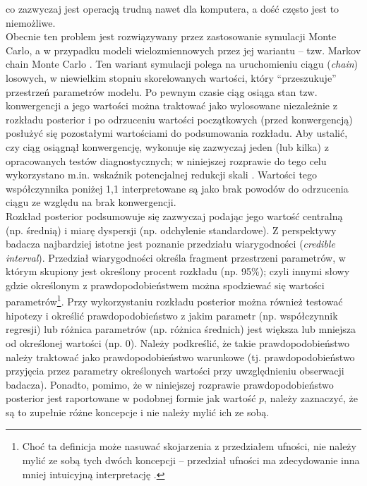 \documentclass[man]{apa6}
\begin{document}
co zazwyczaj jest operacją trudną nawet dla komputera, a dość często jest to niemożliwe. \\
Obecnie ten problem jest rozwiązywany przez zastosowanie symulacji Monte Carlo, a w przypadku modeli wielozmiennowych przez jej wariantu -- tzw. Markov chain Monte Carlo \parencite[MCMC,][]{hastings1970monte}. Ten wariant symulacji polega na uruchomieniu ciągu (\emph{chain}) losowych, w niewielkim stopniu skorelowanych wartości, który ``przeszukuje'' przestrzeń parametrów modelu. Po pewnym czasie ciąg osiąga stan tzw. konwergencji a jego wartości można traktować jako wylosowane niezależnie z rozkładu posterior i po odrzuceniu wartości początkowych (przed konwergencją) posłużyć się pozostałymi wartościami do podsumowania rozkładu. Aby ustalić, czy ciąg osiągnął konwergencję, wykonuje się zazwyczaj jeden (lub kilka) z opracowanych testów diagnostycznych; w niniejszej rozprawie do tego celu wykorzystano m.in. wskaźnik potencjalnej redukcji skali \parencite[\emph{potential scale reduction factor},][]{gelman1992inference}. Wartości tego współczynnika poniżej 1,1 interpretowane są jako brak powodów do odrzucenia ciągu ze względu na brak konwergencji.\\
Rozkład posterior podsumowuje się zazwyczaj podając jego wartość centralną (np. średnią) i miarę dyspersji (np. odchylenie standardowe). Z perspektywy badacza najbardziej istotne jest poznanie przedziału wiarygodności (\emph{credible interval}). Przedział wiarygodności określa fragment przestrzeni parametrów, w którym skupiony jest określony procent rozkładu (np. 95\%); czyli innymi słowy gdzie określonym z prawdopodobieństwem można spodziewać się wartości parametrów\footnote{Choć ta definicja może nasuwać skojarzenia z przedziałem ufności, nie należy mylić ze sobą tych dwóch koncepcji -- przedział ufności ma zdecydowanie inna mniej intuicyjną interpretację \parencite[zob. np.,][]{gill2014bayesian}.}. Przy wykorzystaniu rozkładu posterior można również testować hipotezy i określić prawdopodobieństwo z jakim parametr (np. współczynnik regresji) lub różnica parametrów (np. różnica średnich) jest większa lub mniejsza od określonej wartości (np. 0). Należy podkreślić, że takie prawdopodobieństwo należy traktować jako prawdopodobieństwo warunkowe (tj. prawdopodobieństwo przyjęcia przez parametry określonych wartości przy uwzględnieniu obserwacji badacza). Ponadto, pomimo, że w niniejszej rozprawie prawdopodobieństwo posterior jest raportowane w podobnej formie jak wartość $p$, należy zaznaczyć, że są to zupełnie różne koncepcje i nie należy mylić ich ze sobą.
\end{document}
